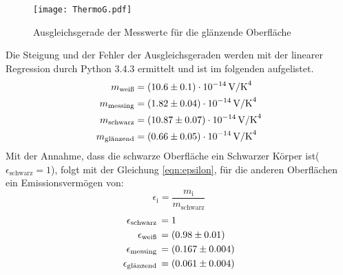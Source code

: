 \begin{figure}[H]
  \centering
  \texttt{[image: ThermoG.pdf]}
  \caption{Ausgleichsgerade der Messwerte für die glänzende Oberfläche}
  \label{fig:ThermoG}
\end{figure}
Die Steigung und der Fehler der Ausgleichsgeraden werden mit der linearer Regression durch Python 3.4.3 ermittelt und ist im folgenden aufgelistet.
\begin{align*}
  m_\text{weiß}     &= (\num{10.6 +- 0.1})   \cdot 10^{-14} \, \text{V/K}^4 \\
  m_\text{messing}  &= (\num{1.82 +- 0.04})  \cdot 10^{-14} \, \text{V/K}^4 \\
  m_\text{schwarz}  &= (\num{10.87 +- 0.07}) \cdot 10^{-14} \, \text{V/K}^4 \\
  m_\text{glänzend} &= (\num{0.66 +- 0.05})  \cdot 10^{-14} \, \text{V/K}^4 \\
\end{align*}
Mit der Annahme, dass die schwarze Oberfläche ein Schwarzer Körper ist($\epsilon_\text{schwarz} = 1$), folgt mit der Gleichung \ref{eqn:epsilon}, für die anderen Oberflächen ein Emissionsvermögen von:
\begin{equation}
  \epsilon_\text{i} = \frac{m_\text{i}}{m_\text{schwarz}}
  \label{eqn:epsilon}
\end{equation}
\begin{align*}
  \epsilon_\text{schwarz}  \, &= 1     \\
  \epsilon_\text{weiß}     \, &= (\num{0.98 +- 0.01}) \\
  \epsilon_\text{messing}  \, &= (\num{0.167 +- 0.004}) \\
  \epsilon_\text{glänzend} \, &= (\num{0.061 +- 0.004}) \\
\end{align*}

